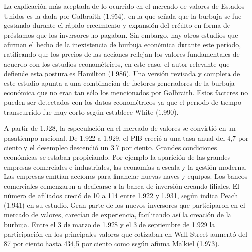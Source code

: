 La explicación más aceptada de lo ocurrido en el mercado de valores de Estados Unidos es la dada por Galbraith (1.954), en la que señala que la burbuja se fue gestando durante el rápido crecimiento y expansión del crédito en forma de préstamos que los inversores no pagaban. Sin embargo, hay otros estudios que afirman el hecho de la inexistencia de burbuja económica durante este período, ratificando que los precios de las acciones reflejan los valores fundamentales de acuerdo con los estudios econométricos, en este caso, el autor relevante que defiende esta postura es Hamilton (1.986). Una versión revisada y completa de este estudio apunta a una combinación de factores generadores de la burbuja económica que no eran tan sólo los mencionados por Galbraith. Estos factores no pueden ser detectados con los datos econométricos ya que el periodo de tiempo transcurrido fue muy corto según establece White (1.990).

A partir de 1.928, la especulación en el mercado de valores se convirtió en un pasatiempo nacional. De 1.922 a 1.929, el PIB creció a una tasa anual del 4,7 por ciento y el desempleo descendió un 3,7 por ciento. Grandes condiciones económicas se estaban propiciando. Por ejemplo la aparición de las grandes empresas comerciales e industriales, las economías a escala y la gestión moderna. Las empresas emitían acciones para financiar nuevas naves y equipos. Los bancos comerciales comenzaron a dedicarse a la banca de inversión creando filiales. El número de afiliados creció de 10 a 114 entre 1.922 y 1.931, según indica Peach (1.941) en su estudio. Gran parte de los nuevos inversores que participaron en el mercado de valores, carecían de experiencia, facilitando así la creación de la burbuja. Entre el 3 de marzo de 1.928 y el 3 de septiembre de 1.929 la participación en los principales valores que cotizaban en Wall Street aumentó del 87 por ciento hasta 434,5 por ciento como según afirma Malkiel (1.973).

